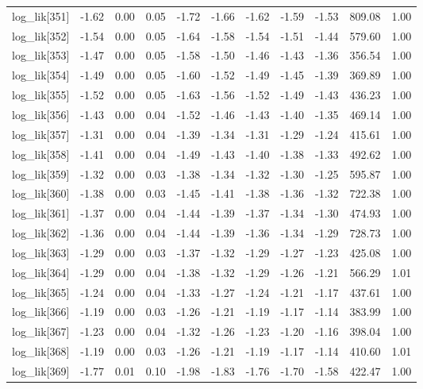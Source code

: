 \begin{table}[ht]
\begin{tabular}{rrrrrrrrrrr}
  log\_lik[351] & -1.62 & 0.00 & 0.05 & -1.72 & -1.66 & -1.62 & -1.59 & -1.53 & 809.08 & 1.00 \\ 
  log\_lik[352] & -1.54 & 0.00 & 0.05 & -1.64 & -1.58 & -1.54 & -1.51 & -1.44 & 579.60 & 1.00 \\ 
  log\_lik[353] & -1.47 & 0.00 & 0.05 & -1.58 & -1.50 & -1.46 & -1.43 & -1.36 & 356.54 & 1.00 \\ 
  log\_lik[354] & -1.49 & 0.00 & 0.05 & -1.60 & -1.52 & -1.49 & -1.45 & -1.39 & 369.89 & 1.00 \\ 
  log\_lik[355] & -1.52 & 0.00 & 0.05 & -1.63 & -1.56 & -1.52 & -1.49 & -1.43 & 436.23 & 1.00 \\ 
  log\_lik[356] & -1.43 & 0.00 & 0.04 & -1.52 & -1.46 & -1.43 & -1.40 & -1.35 & 469.14 & 1.00 \\ 
  log\_lik[357] & -1.31 & 0.00 & 0.04 & -1.39 & -1.34 & -1.31 & -1.29 & -1.24 & 415.61 & 1.00 \\ 
  log\_lik[358] & -1.41 & 0.00 & 0.04 & -1.49 & -1.43 & -1.40 & -1.38 & -1.33 & 492.62 & 1.00 \\ 
  log\_lik[359] & -1.32 & 0.00 & 0.03 & -1.38 & -1.34 & -1.32 & -1.30 & -1.25 & 595.87 & 1.00 \\ 
  log\_lik[360] & -1.38 & 0.00 & 0.03 & -1.45 & -1.41 & -1.38 & -1.36 & -1.32 & 722.38 & 1.00 \\ 
  log\_lik[361] & -1.37 & 0.00 & 0.04 & -1.44 & -1.39 & -1.37 & -1.34 & -1.30 & 474.93 & 1.00 \\ 
  log\_lik[362] & -1.36 & 0.00 & 0.04 & -1.44 & -1.39 & -1.36 & -1.34 & -1.29 & 728.73 & 1.00 \\ 
  log\_lik[363] & -1.29 & 0.00 & 0.03 & -1.37 & -1.32 & -1.29 & -1.27 & -1.23 & 425.08 & 1.00 \\ 
  log\_lik[364] & -1.29 & 0.00 & 0.04 & -1.38 & -1.32 & -1.29 & -1.26 & -1.21 & 566.29 & 1.01 \\ 
  log\_lik[365] & -1.24 & 0.00 & 0.04 & -1.33 & -1.27 & -1.24 & -1.21 & -1.17 & 437.61 & 1.00 \\ 
  log\_lik[366] & -1.19 & 0.00 & 0.03 & -1.26 & -1.21 & -1.19 & -1.17 & -1.14 & 383.99 & 1.00 \\ 
  log\_lik[367] & -1.23 & 0.00 & 0.04 & -1.32 & -1.26 & -1.23 & -1.20 & -1.16 & 398.04 & 1.00 \\ 
  log\_lik[368] & -1.19 & 0.00 & 0.03 & -1.26 & -1.21 & -1.19 & -1.17 & -1.14 & 410.60 & 1.01 \\ 
  log\_lik[369] & -1.77 & 0.01 & 0.10 & -1.98 & -1.83 & -1.76 & -1.70 & -1.58 & 422.47 & 1.00 \\ 

\end{tabular}
\end{table}
